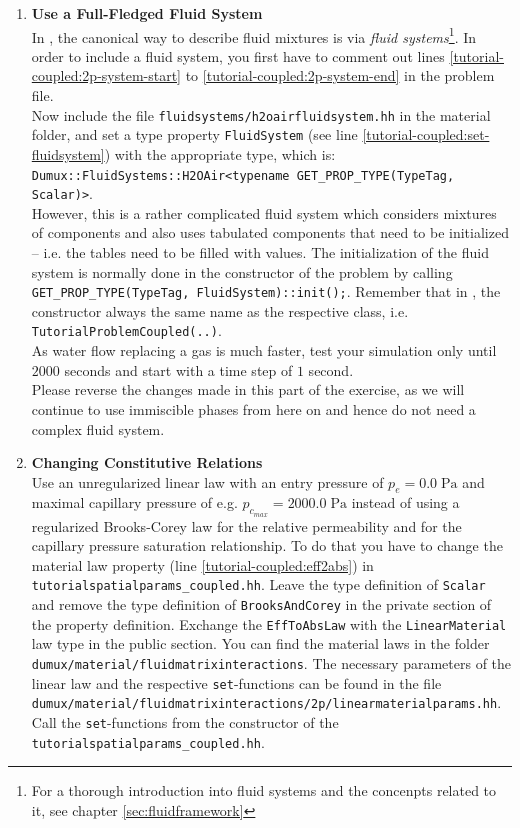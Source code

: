 \begin{enumerate}
\item \textbf{Use a Full-Fledged Fluid System} \\
In \Dumux, the canonical way to describe fluid mixtures is via \textit{fluid systems}\footnote{For a thorough introduction into fluid systems and the concenpts related to it, see chapter \ref{sec:fluidframework}}. 
In order to include a fluid system, you first have to comment out lines \ref{tutorial-coupled:2p-system-start} 
to \ref{tutorial-coupled:2p-system-end} in the problem file.\\
Now include the file \texttt{fluidsystems/h2oairfluidsystem.hh} in the material folder, and set a type property \texttt{FluidSystem} (see line \ref{tutorial-coupled:set-fluidsystem})
with the appropriate type, which is:\\
\texttt{Dumux::FluidSystems::H2OAir<typename GET\_PROP\_TYPE(TypeTag, Scalar)>}.\\
However, this is a rather complicated fluid system which 
considers mixtures of components and also uses tabulated components that need to be initialized -- i.e. the tables need to be filled with values. 
The initialization of the fluid system is normally done in the constructor of the problem by calling \texttt{GET\_PROP\_TYPE(TypeTag, FluidSystem)::init();}. 
Remember that in \Cplusplus, the constructor always the same name as the respective class, i.e. \texttt{TutorialProblemCoupled(..)}.\\
As water flow replacing a gas is much faster, test your simulation only until $2000$ seconds and start with a time step of $1$ second.\\
Please reverse the changes made in this part of the exercise, as we will continue to use immiscible phases from here on and hence do not need a complex fluid system.

\item \textbf{Changing Constitutive Relations} \\
  Use an unregularized linear law with an entry pressure of $p_e = 0.0\;\text{Pa}$ and maximal capillary pressure of e.g. $p_{c_{max}} = 2000.0\;\text{Pa}$ instead of using a
 regularized Brooks-Corey law for the
  relative permeability and for the capillary pressure saturation relationship. To do that you have
  to change the material law property (line \ref{tutorial-coupled:eff2abs}) in \texttt{tutorialspatialparams\_coupled.hh}. Leave the type definition of \texttt{Scalar} and remove
 the type definition of \texttt{BrooksAndCorey} in the private section of the property definition. Exchange the \texttt{EffToAbsLaw} with the \texttt{LinearMaterial} law type in the 
public section.
 You can find the material laws in the folder 
  \verb+dumux/material/fluidmatrixinteractions+. The necessary parameters
of the linear law and the respective \texttt{set}-functions can be found
 in the file \\
 \verb+dumux/material/fluidmatrixinteractions/2p/linearmaterialparams.hh+.\\
Call the \texttt{set}-functions from the constructor of the \texttt{tutorialspatialparams\_coupled.hh}.
 

\end{enumerate}
